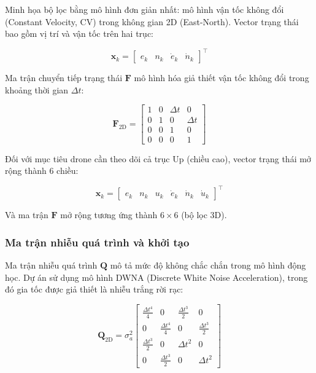 Minh họa bộ lọc bằng mô hình đơn giản nhất: mô hình vận tốc không đổi (Constant Velocity, CV) trong không gian 2D (East-North). Vector trạng thái bao gồm vị trí và vận tốc trên hai trục:

\begin{equation}
\mathbf{x}_k = \begin{bmatrix} e_k & n_k & \dot{e}_k & \dot{n}_k \end{bmatrix}^\top
\end{equation}

Ma trận chuyển tiếp trạng thái $\mathbf{F}$ mô hình hóa giả thiết vận tốc không đổi trong khoảng thời gian $\Delta t$:

\begin{equation}
\mathbf{F}_{2\text{D}} = \begin{bmatrix}
1 & 0 & \Delta t & 0 \\
0 & 1 & 0 & \Delta t \\
0 & 0 & 1 & 0 \\
0 & 0 & 0 & 1
\end{bmatrix}
\end{equation}

Đối với mục tiêu drone cần theo dõi cả trục Up (chiều cao), vector trạng thái mở rộng thành 6 chiều:

\begin{equation}
\mathbf{x}_k = \begin{bmatrix} e_k & n_k & u_k & \dot{e}_k & \dot{n}_k & \dot{u}_k \end{bmatrix}^\top
\end{equation}

Và ma trận $\mathbf{F}$ mở rộng tương ứng thành $6 \times 6$ (bộ lọc 3D).

\subsubsection{Ma trận nhiễu quá trình và khởi tạo}

\hspace{0.5cm} Ma trận nhiễu quá trình $\mathbf{Q}$ mô tả mức độ không chắc chắn trong mô hình động học. Dự án sử dụng mô hình DWNA (Discrete White Noise Acceleration), trong đó gia tốc được giả thiết là nhiễu trắng rời rạc:

\begin{equation}
\mathbf{Q}_{2\text{D}} = \sigma_a^2 \begin{bmatrix}
\frac{\Delta t^4}{4} & 0 & \frac{\Delta t^3}{2} & 0 \\
0 & \frac{\Delta t^4}{4} & 0 & \frac{\Delta t^3}{2} \\
\frac{\Delta t^3}{2} & 0 & \Delta t^2 & 0 \\
0 & \frac{\Delta t^3}{2} & 0 & \Delta t^2
\end{bmatrix}
\end{equation}

